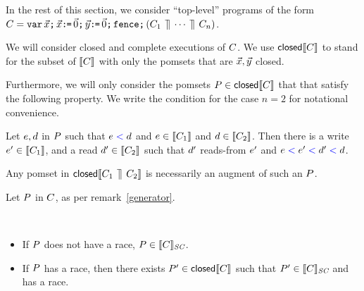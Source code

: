 \begin{remark}\label{generator}
In the rest of this section, we consider ``top-level'' programs of the form
$C = \texttt{var}\,\vec{x}\texttt{;}\,
    \vec{x}\texttt{:}\mkern-1mu\texttt{=}\,\vec{0}\texttt{;}\,
    \vec{y}\texttt{:}\mkern-1mu\texttt{=}\,\vec{0}\texttt{;}\,
    \texttt{fence}\texttt{;}\,
    (C_1 \,\mathbin{\rrceil}\, \cdots \,\mathbin{\rrceil}\, C_n)
$.

We will consider closed and complete executions of $\aCmd$. We use $\textsf{closed}\llbracket C\rrbracket$ to stand for the subset of $\llbracket C\rrbracket$  with only  the pomsets that are $\vec{x}, \vec{y}$ closed.  

Furthermore, we will only consider the pomsets $P \in\textsf{closed}\llbracket C\rrbracket$ that that satisfy the following property.   We write the condition for the case $n=2$ for notational convenience.

Let $e, d$ in $P$ such that $e\mathrel{{\color{blue}<}}d$ and $e \in \llbracket C_1\rrbracket$ and  $d \in \llbracket C_2\rrbracket $.  Then there is a write  $e' \in \llbracket C_1\rrbracket$, and  a read $d' \in \llbracket C_2\rrbracket$ such that  $d'$ reads-from $e'$ and $e \mathrel{{\color{blue}<}} e' \mathrel{{\color{blue}<}} d' \mathrel{{\color{blue}<}} d$. 

Any pomset in $\textsf{closed}\llbracket C_1 \,\mathbin{\rrceil}\, C_2\rrbracket$ is necessarily an augment of such an $P$.
\end{remark}

Let $P$ in $\aCmd$, as per remark~\ref{generator}. 
\begin{theorem} [DRF] \hfill\\
\begin{itemize}
\item If $P$ does not have a race, $P \in \llbracket C\rrbracket_{\textit{SC}}$. 
\item If $P$ has a race, then there exists $P'\in \textsf{closed}\llbracket C\rrbracket$ such that $P' \in \llbracket C\rrbracket_{\textit{SC}}$ and has a race.
\end{itemize}
\end{theorem}



\endinput

We say that $\aCmd$ has an \emph{SC race} if there is some pomset in $\semsc{\aCmd}$ that contains a data race.


In this section we show that if $\semsc{\aCmd}\subseteq\sem{\aCmd}$ has only
race-free executions, then each pomset $\aPS\in\sem{\aCmd}$ is ``equivalent''
to some $\aPS'\in\semsc{\aCmd}$, where $\aPS'$ may have more events, but
preserves labeling and has less order.

We say that $\aPS\suborder\aPS'$ if there is an injection
$\inj:\Event'\rightarrow\Event$ such that:
\begin{itemize}
\item $\labelingAct'(\aEv) = \labelingAct(\inj(\aEv))$
\item $\labelingForm'(\aEv)$ implies $\labelingForm(\inj(\aEv))$
\item $\labelingForm(\bEv)$ implies $\bigvee_{\aEv\in\inj^{-1}(\bEv)}(\labelingForm'(\aEv))$
\item $\aEv\le'\bEv$ implies $\inj(\aEv)\le\inj(\bEv)$
\item $\aEv\gtN'\bEv$ implies $\inj(\aEv)\gtN\inj(\bEv)$
\end{itemize}

